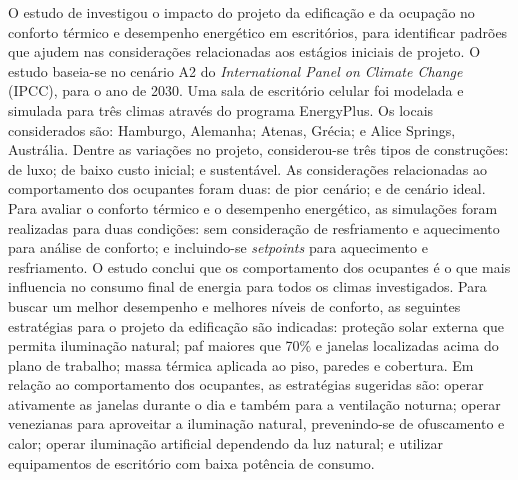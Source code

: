 \documentclass[brazil,hardcopy,openany]{ufscthesis} %
\begin{document}
O estudo de  investigou o impacto do projeto da edificação e da ocupação no conforto térmico e desempenho energético em escritórios, para identificar padrões que ajudem nas considerações relacionadas aos estágios iniciais de projeto. O estudo baseia-se no cenário A2 do \textit{International Panel on Climate Change} (IPCC), para o ano de 2030.
Uma sala de escritório celular foi modelada e simulada para três climas através do programa EnergyPlus. Os locais considerados são: Hamburgo, Alemanha; Atenas, Grécia; e Alice Springs, Austrália. Dentre as variações no projeto, considerou-se três tipos de construções: de luxo; de baixo custo inicial; e sustentável. As considerações relacionadas ao comportamento dos ocupantes foram duas: de pior cenário; e de cenário ideal. Para avaliar o conforto térmico e o desempenho energético, as simulações foram realizadas para duas condições: sem consideração de resfriamento e aquecimento para análise de conforto; e incluindo-se \textit{setpoints} para aquecimento e resfriamento.
O estudo conclui que os comportamento dos ocupantes é o que mais influencia no consumo final de energia para todos os climas investigados.
Para buscar um melhor desempenho e melhores níveis de conforto, as seguintes estratégias para o projeto da edificação são indicadas: proteção solar externa que permita iluminação natural; \acrshort{paf} maiores que 70\% e janelas localizadas acima do plano de trabalho; massa térmica aplicada ao piso, paredes e cobertura. Em relação ao comportamento dos ocupantes, as estratégias sugeridas são: operar ativamente as janelas durante o dia e também para a ventilação noturna; operar venezianas para aproveitar a iluminação natural, prevenindo-se de ofuscamento e calor; operar iluminação artificial dependendo da luz natural; e utilizar equipamentos de escritório com baixa potência de consumo.
\end{document}
